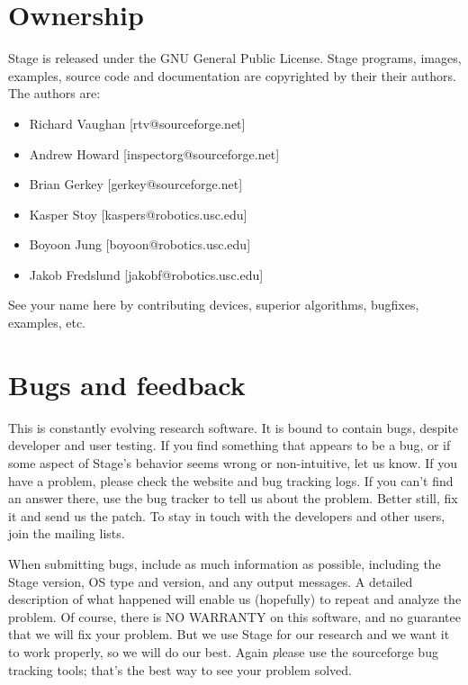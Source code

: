 \documentclass[11pt,twoside]{report}
\begin{document}
  \section{Ownership}

    Stage is released under the GNU General Public
    License. Stage programs, images, examples, source code and
    documentation are copyrighted by their their authors. The authors are:

      \begin{itemize}
      \item[] Richard Vaughan [rtv@sourceforge.net]
      \item[] Andrew Howard [inspectorg@sourceforge.net]
      \item[] Brian Gerkey [gerkey@sourceforge.net]
      \item[] Kasper Stoy [kaspers@robotics.usc.edu]
      \item[] Boyoon Jung [boyoon@robotics.usc.edu]
      \item[] Jakob Fredslund [jakobf@robotics.usc.edu]
      \end{itemize}

	See your name here by contributing devices, superior
	algorithms, bugfixes, examples, etc.

  \section{Bugs and feedback}
  
    This is constantly evolving research software. It is bound to
    contain bugs, despite developer and user testing.  If you find
    something that appears to be a bug, or if some aspect of Stage's
    behavior seems wrong or non-intuitive, let us know. If you have a
    problem, please check the website and bug tracking logs. If you
    can't find an answer there, use the bug tracker to tell us about
    the problem. Better still, fix it and send us the patch. To stay
    in touch with the developers and other users, join the mailing
    lists.

    When submitting bugs, include as much information as possible,
    including the Stage version, OS type and version, and any output
    messages.  A detailed description of what happened will enable us
    (hopefully) to repeat and analyze the problem.  Of course, there
    is NO WARRANTY on this software, and no guarantee that we will fix
    your problem.  But we use Stage for our research and we want it to
    work properly, so we will do our best. Again {\emph please use the
    sourceforge bug tracking tools}; that's the best way to see your
    problem solved.
\end{document}
